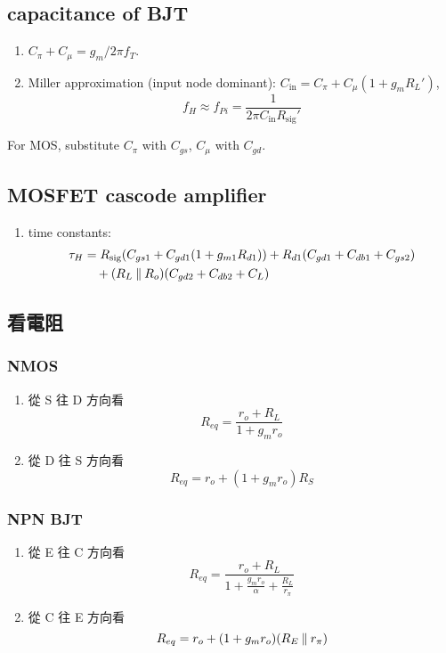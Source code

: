 \documentclass[12pt, a4paper]{article}
\begin{document}
\subsection{capacitance of BJT}
\begin{enumerate}
  \item $C_\pi + C_\mu = g_m / 2\pi f_T$.
  \item Miller approximation (input node dominant):
    $C_\text{in} = C_\pi + C_\mu(1 + g_mR_L')$,
    \[ f_H \approx f_{Pi} = \frac{1}{2\pi C_\text{in} R_\text{sig}'} \]
\end{enumerate}
For MOS, substitute $C_\pi$ with $C_{gs}$, $C_\mu$ with $C_{gd}$.
\subsection{MOSFET cascode amplifier}
\begin{enumerate}
  \item time constants:
    \begin{align*}
      \tau_{H} &= R_\text{sig} (C_{gs1} + C_{gd1}(1+g_{m1}R_{d1}))
      + R_{d1}(C_{gd1} + C_{db1} + C_{gs2}) \\
      & \quad + (R_L \mathbin{\|} R_o) (C_{gd2} + C_{db2} + C_L)
    \end{align*}
\end{enumerate}
\subsection{看電阻}
\subsubsection{NMOS}
\begin{enumerate}
  \item 從 S 往 D 方向看 
    \[ R_{eq} = \frac{r_o + R_L}{1+g_mr_o} \]
  \item 從 D 往 S 方向看 
    \[ R_{eq} = r_o + (1 + g_m r_o) R_S \]
\end{enumerate}
\subsubsection{NPN BJT}
\begin{enumerate}
  \item 從 E 往 C 方向看 
    \[ R_{eq} = \frac{r_o + R_L}{1+\frac{g_mr_o}{\alpha} + \frac{R_L}{r_\pi}} \]
  \item 從 C 往 E 方向看 
    \[ R_{eq} = r_o + (1 + g_mr_o) (R_E \mathbin{\|} r_\pi) \]
\end{enumerate}
\end{document}
